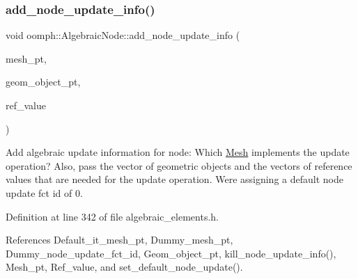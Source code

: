 \mbox{\label{classoomph_1_1AlgebraicNode_a646b087c73a6b355709369d30081fb4a}} 
\subsubsection{\texorpdfstring{add\+\_\+node\+\_\+update\+\_\+info()}{add\_node\_update\_info()}\hspace{0.1cm}{\footnotesize\ttfamily [2/2]}}
{\footnotesize\ttfamily void oomph\+::\+Algebraic\+Node\+::add\+\_\+node\+\_\+update\+\_\+info (\begin{DoxyParamCaption}\item[{\hyperlink{classoomph_1_1AlgebraicMesh}{Algebraic\+Mesh} $\ast$}]{mesh\+\_\+pt,  }\item[{const \hyperlink{classoomph_1_1Vector}{Vector}$<$ \hyperlink{classoomph_1_1GeomObject}{Geom\+Object} $\ast$$>$ \&}]{geom\+\_\+object\+\_\+pt,  }\item[{const \hyperlink{classoomph_1_1Vector}{Vector}$<$ double $>$ \&}]{ref\+\_\+value }\end{DoxyParamCaption})\hspace{0.3cm}{\ttfamily [inline]}}



Add algebraic update information for node\+: Which \hyperlink{classoomph_1_1Mesh}{Mesh} implements the update operation? Also, pass the vector of geometric objects and the vectors of reference values that are needed for the update operation. We\textquotesingle{}re assigning a default node update fct id of 0. 



Definition at line 342 of file algebraic\+\_\+elements.\+h.



References Default\+\_\+it\+\_\+mesh\+\_\+pt, Dummy\+\_\+mesh\+\_\+pt, Dummy\+\_\+node\+\_\+update\+\_\+fct\+\_\+id, Geom\+\_\+object\+\_\+pt, kill\+\_\+node\+\_\+update\+\_\+info(), Mesh\+\_\+pt, Ref\+\_\+value, and set\+\_\+default\+\_\+node\+\_\+update().

\mbox{\label{classoomph_1_1AlgebraicNode_aac2c907cb2258892583d38e8c3e52326}} 
